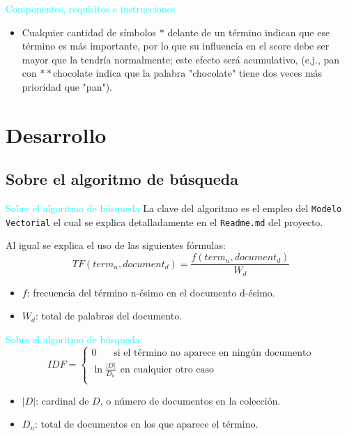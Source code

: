 \documentclass[a4paper, 12pt]{beamer}
\begin{document}
\begin{frame}{\textcolor{cyan}{Componentes, requisitos e instrucciones}}
    \begin{itemize}
        \item {\small Cualquier cantidad de símbolos $*$ delante de un término indican que ese término es más importante, por lo que su influencia en el score debe ser mayor que la tendría normalmente; este efecto será acumulativo, (e.j., pan con $**$chocolate indica que la palabra "chocolate" tiene dos veces más prioridad que "pan").}
    \end{itemize}
\end{frame}

\section{Desarrollo}

\subsection{Sobre el algoritmo de búsqueda}

\begin{frame}{\textcolor{cyan}{Sobre el algoritmo de búsqueda}}
    La clave del algoritmo es el empleo del {\tt Modelo Vectorial} el cual se explica detalladamente en el {\tt Readme.md} del proyecto.


    Al igual se explica el uso de las siguientes fórmulas:
    \begin{equation}
        TF(term_n, document_d) = \frac{f(term_n, document_d)}{W_d}
    \end{equation}
    \begin{itemize}
        \item $f$: frecuencia del término n-ésimo en el documento d-ésimo.
        \item $W_{d}$: total de palabras del documento.
    \end{itemize}

\end{frame}

\begin{frame}{\textcolor{cyan}{Sobre el algoritmo de búsqueda}}
    \begin{equation}
        IDF = 
        \begin{cases} 0~~~~~~~~\text{si el término no aparece en ningún documento}\\ \ln{\frac{|D|}{D_n}~~\text{en cualquier otro caso}} \\
        \end{cases}
    \end{equation}
    \begin{itemize}
        \item $|D|$: cardinal de $D$, o número de documentos en la colección.
        \item $D_{n}$: total de documentos en los que aparece el término.
    \end{itemize}
\end{frame}
\end{document}
